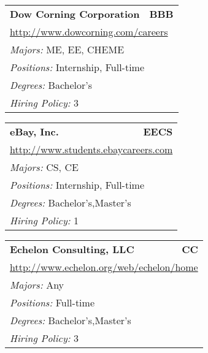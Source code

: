 \documentclass[twoside]{article}
\begin{document}
\begin{center}
\begin{multicols}{3}
\begin{FlushLeft}
\begin{minipage}{.9\columnwidth}
\end{minipage}
 
\begin{minipage}{.9\columnwidth}\begin{tabularx}{.95\columnwidth}{Xr}
                 {\Large\bf Dow Corning Corporation} & {\Large\bf BBB}\\
    \multicolumn{2}{p{.95\columnwidth}}{\url{http://www.dowcorning.com/careers}}\\
    \multicolumn{2}{p{.95\columnwidth}}{\emph{Majors:} ME, EE, CHEME}\\
    \multicolumn{2}{p{.95\columnwidth}}{\emph{Positions:} Internship, Full-time}\\
    \multicolumn{2}{p{.95\columnwidth}}{\emph{Degrees:} Bachelor's}\\
    \multicolumn{2}{p{.95\columnwidth}}{\emph{Hiring Policy:} 3}\\
    \end{tabularx}
    
\end{minipage}
 
\begin{minipage}{.9\columnwidth}\begin{tabularx}{.95\columnwidth}{Xr}
                 {\Large\bf eBay, Inc.} & {\Large\bf EECS}\\
    \multicolumn{2}{p{.95\columnwidth}}{\url{http://www.students.ebaycareers.com}}\\
    \multicolumn{2}{p{.95\columnwidth}}{\emph{Majors:} CS, CE}\\
    \multicolumn{2}{p{.95\columnwidth}}{\emph{Positions:} Internship, Full-time}\\
    \multicolumn{2}{p{.95\columnwidth}}{\emph{Degrees:} Bachelor's,Master's}\\
    \multicolumn{2}{p{.95\columnwidth}}{\emph{Hiring Policy:} 1}\\
    \end{tabularx}
    
\end{minipage}
 
\begin{minipage}{.9\columnwidth}\begin{tabularx}{.95\columnwidth}{Xr}
                 {\Large\bf Echelon Consulting, LLC} & {\Large\bf CC}\\
    \multicolumn{2}{p{.95\columnwidth}}{\url{http://www.echelon.org/web/echelon/home}}\\
    \multicolumn{2}{p{.95\columnwidth}}{\emph{Majors:} Any}\\
    \multicolumn{2}{p{.95\columnwidth}}{\emph{Positions:} Full-time}\\
    \multicolumn{2}{p{.95\columnwidth}}{\emph{Degrees:} Bachelor's,Master's}\\
    \multicolumn{2}{p{.95\columnwidth}}{\emph{Hiring Policy:} 3}\\
    \end{tabularx}
    

\end{minipage}
\end{FlushLeft}
\end{multicols}
\end{center}
\end{document}
